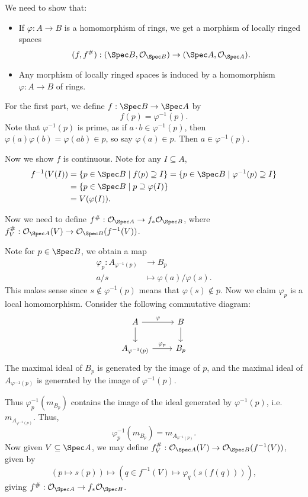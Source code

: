\documentclass[12pt]{article}
\begin{document}
\begin{proofbox}
	We need to show that:
	\begin{itemize}
		\item If $\varphi : A \to B$ is a homomorphism of rings, we get a morphism of locally ringed spaces
			\[
				(f, f^{\#}) : (\Spec B, \mathcal{O}_{\Spec B}) \to (\Spec A, \mathcal{O}_{\Spec A}).
			\]
		\item Any morphism of locally ringed spaces is induced by a homomorphism $\varphi : A \to B$ of rings.
	\end{itemize}
	For the first part, we define $f : \Spec B \to \Spec A$ by
	\[
	f(p) = \varphi^{-1}(p).
	\]
	Note that $\varphi^{-1}(p)$ is prime, as if $a \cdot b \in \varphi^{-1}(p)$, then $\varphi(a) \varphi(b) = \varphi(ab) \in p$, so say $\varphi(a) \in p$. Then $a \in \varphi^{-1}(p)$.

	Now we show $f$ is continuous. Note for any $I \subseteq A$,
	\begin{align*}
		f^{-1}(V(I)) &= \{p \in \Spec B \mid f(p) \supseteq I\} = \{p \in \Spec B \mid \varphi^{-1}(p) \supseteq I\} \\
			     &= \{p \in \Spec B \mid p \supseteq \varphi(I)\} \\
			     &= V(\varphi(I)).
	\end{align*}

	Now we need to define $f^{\#} : \mathcal{O}_{\Spec A} \to f_\ast \mathcal{O}_{\Spec B}$, where $f^{\#}_V : \mathcal{O}_{\Spec A}(V) \to \mathcal{O}_{\Spec B}(f^{-1}(V))$.

	Note for $p \in \Spec B$, we obtain a map
	\begin{align*}
		\varphi_p : A_{\varphi^{-1}(p)} &\to B_p \\
		a/s &\mapsto \varphi(a)/\varphi(s).
	\end{align*}
	This makes sense since $s \not \in \varphi^{-1}(p)$ means that $\varphi(s) \not \in p$. Now we claim $\varphi_p$ is a local homomorphism. Consider the following commutative diagram:
	\[
	\begin{tikzcd}
		A \arrow[r, "\varphi"] \arrow[d, ""] & B \arrow[d, ""] \\
		A_{\varphi^{-1}(p)} \arrow[r, "\varphi_p"] & B_p
	\end{tikzcd}
	\]
	The maximal ideal of $B_p$ is generated by the image of $p$, and the maximal ideal of $A_{\varphi^{-1}(p)}$ is generated by the image of $\varphi^{-1}(p)$.

	Thus $\varphi^{-1}_p(m_{B_p})$ contains the image of the ideal generated by $\varphi^{-1}(p)$, i.e. $m_{A_{\varphi^{-1}(p)}}$. Thus,
	\[
	\varphi^{-1}_p(m_{B_p}) = m_{A_{\varphi^{-1}(p)}}.
	\]
	Now given $V \subseteq \Spec A$, we may define $f^{\#}_V : \mathcal{O}_{\Spec A}(V) \to \mathcal{O}_{\Spec B}(f^{-1}(V))$, given by
	\[
		(p \mapsto s(p)) \mapsto (q \in f^{-1}(V) \mapsto \varphi_q(s(f(q)))),
	\]
	giving $f^{\#} : \mathcal{O}_{\Spec A} \to f_\ast \mathcal{O}_{\Spec B}$.


\end{proofbox}
\end{document}
